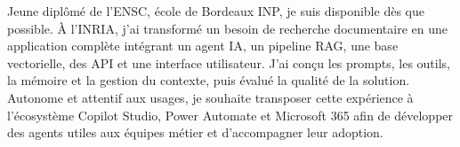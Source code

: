 
\begin{cvparagraph}
Jeune diplômé de l’ENSC, école de Bordeaux INP, je suis disponible dès que possible. À l’INRIA, j’ai transformé un besoin de recherche documentaire en une application complète intégrant un agent IA, un pipeline RAG, une base vectorielle, des API et une interface utilisateur. J’ai conçu les prompts, les outils, la mémoire et la gestion du contexte, puis évalué la qualité de la solution. Autonome et attentif aux usages, je souhaite transposer cette expérience à l’écosystème Copilot Studio, Power Automate et Microsoft 365 afin de développer des agents utiles aux équipes métier et d’accompagner leur adoption.
\end{cvparagraph}
